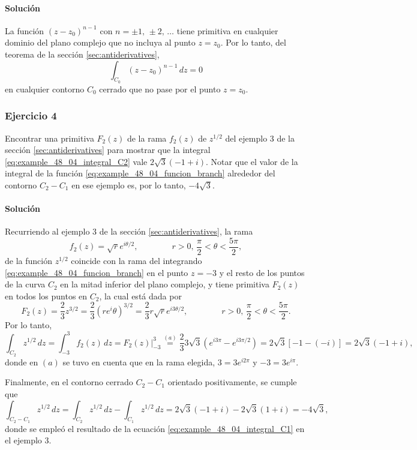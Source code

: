 \documentclass[a4paper]{report}
\begin{document}
\paragraph{Solución} La función \((z-z_0)^{n-1}\) con \(n=\pm1,\,\pm2,\,\dots\) tiene primitiva en cualquier dominio del plano complejo que no incluya al punto \(z=z_0\). Por lo tanto, del teorema de la sección \ref{sec:antiderivatives},
\[
 \int_{C_0}(z-z_0)^{n-1}\,dz=0
\]
en cualquier contorno \(C_0\) cerrado que no pase por el punto \(z=z_0\).

\subsubsection*{Ejercicio 4}

Encontrar una primitiva \(F_2(z)\) de la rama \(f_2(z)\) de \(z^{1/2}\) del ejemplo 3 de la sección \ref{sec:antiderivatives} para mostrar que la integral \ref{eq:example_48_04_integral_C2} vale \(2\sqrt{3}(-1+i)\). Notar que el valor de la integral de la función \ref{eq:example_48_04_funcion_branch} alrededor del contorno \(C_2-C_1\) en ese ejemplo es, por lo tanto, \(-4\sqrt{3}\).

\paragraph{Solución} Recurriendo al ejemplo 3 de la sección \ref{sec:antiderivatives}, la rama 
\[
 f_2(z)=\sqrt{r}e^{i\theta/2},
 \qquad\qquad
 r>0,\,\frac{\pi}{2}<\theta<\frac{5\pi}{2},
\]
de la función \(z^{1/2}\) coincide con la rama del integrando \ref{eq:example_48_04_funcion_branch} en el punto \(z=-3\) y el resto de los puntos de la curva \(C_2\) en la mitad inferior del plano complejo, y tiene primitiva \(F_2(z)\) en todos los puntos en \(C_2\), la cual está dada por 
\[
 F_2(z)=\frac{2}{3}z^{3/2}=\frac{2}{3}(re^i\theta)^{3/2}=\frac{2}{3}r\sqrt{r}e^{i3\theta/2},
 \qquad\qquad
 r>0,\,\frac{\pi}{2}<\theta<\frac{5\pi}{2}.
\]
Por lo tanto, 
\[
 \int_{C_2}z^{1/2}\,dz=\int_{-3}^3f_2(z)\,dz=F_2(z)\bigg|_{-3}^3\overset{(a)}{=}\frac{2}{3}3\sqrt{3}\left(e^{i3\pi}-e^{i3\pi/2}\right)=2\sqrt{3}\left[-1-(-i)\right]=2\sqrt{3}(-1+i),
\]
donde en \((a)\) se tuvo en cuenta que en la rama elegida, \(3=3e^{i2\pi}\) y \(-3=3e^{i\pi}\).

Finalmente, en el contorno cerrado \(C_2-C_1\) orientado positivamente, se cumple que 
\[
 \int_{C_2-C_1}z^{1/2}\,dz=\int_{C_2}z^{1/2}\,dz-\int_{C_1}z^{1/2}\,dz=2\sqrt{3}(-1+i)-2\sqrt{3}(1+i)=-4\sqrt{3},
\]
donde se empleó el resultado de la ecuación \ref{eq:example_48_04_integral_C1} en el ejemplo 3.
\end{document}
